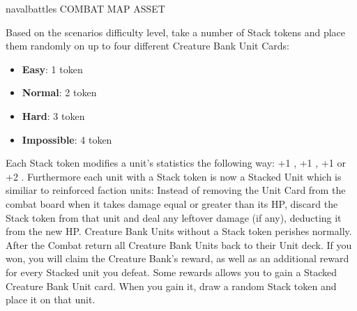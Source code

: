 \begin{multicols*}{2}
\begin{expansion}{navalbattles}
  COMBAT MAP ASSET

  Based on the scenarios difficulty level, take a number of Stack tokens and place them randomly on up to four different Creature Bank Unit Cards:
  \begin{itemize}
    \item \textbf{Easy}: 1 token
    \item \textbf{Normal}: 2 token
    \item \textbf{Hard}: 3 token
    \item \textbf{Impossible}: 4 token
  \end{itemize}

  Each Stack token modifies a unit's statistics the following way: +1 , +1 , +1  or +2 .
  Furthermore each unit with a Stack token is now a Stacked Unit which is similiar to reinforced faction units: Instead of removing the Unit Card from the combat board when it takes damage equal or greater than its HP, discard the Stack token from that unit and deal any leftover damage (if any), deducting it from the new HP.
  Creature Bank Units without a Stack token perishes normally.
  After the Combat return all Creature Bank Units back to their Unit deck.
  If you won, you will claim the Creature Bank's reward, as well as an additional reward for every Stacked unit you defeat.
  Some rewards allows you to gain a Stacked Creature Bank Unit card.
  When you gain it, draw a random Stack token and place it on that unit.
\end{expansion}

\end{multicols*}
